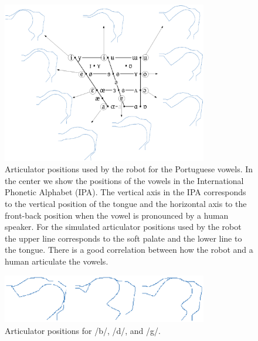 \begin{figure}
\centering
\includegraphics[width=0.8\textwidth]{include/babbling/images/vowels.eps}
\caption{Articulator positions used by the robot for the
  Portuguese vowels. In the center we show the positions of the vowels
  in the International Phonetic Alphabet (IPA). The vertical axis in
  the IPA corresponds to the vertical position of the tongue and the
  horizontal axis to the front-back position when the vowel is
  pronounced by a human speaker. For the simulated articulator
  positions used by the robot the upper line corresponds to the soft
  palate and the lower line to the tongue. There is a good correlation
  between how the robot and a human articulate the vowels.}
\label{fig:babbling:positions}
\end{figure}

\begin{figure}
\centering
\includegraphics[width=0.8\textwidth]{include/babbling/images/cardinal.eps}
\caption{Articulator positions for /b/, /d/, and /g/.}
\label{fig:babbling:cardinal}
\end{figure}


